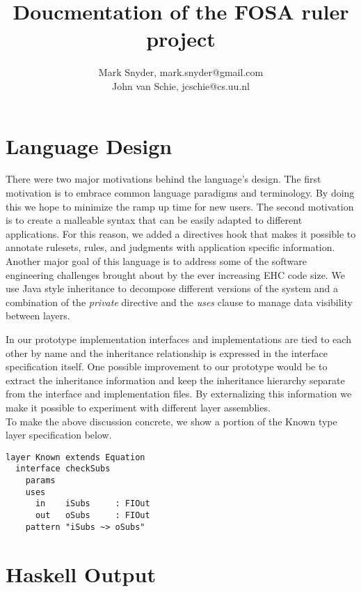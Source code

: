 \documentclass[10pt]{article}
\begin{document}
\title{Doucmentation of the FOSA ruler project}
\author{Mark Snyder, mark.snyder@gmail.com\\John van Schie, jcschie@cs.uu.nl}
\date{}
\maketitle
\parindent=0in

\section{Language Design}
There were two major motivations behind the language's design.  The first motivation is to
embrace common language paradigms and terminology.  By doing this we hope to minimize
the ramp up time for new users.  The second motivation is to create a malleable syntax that 
can be easily adapted to different applications.  For this reason, we added a directives hook
that makes it possible to annotate rulesets, rules, and judgments with application specific
information.  \\

Another major goal of this language is to address some of the software engineering challenges
brought about by the ever increasing EHC code size.  We use Java style inheritance to decompose
different versions of the system and a combination of the \emph{private} directive and the \emph{uses}
clause to manage data visibility between layers.

In our prototype implementation interfaces and implementations are tied to each other by name
and the inheritance relationship is expressed in the interface specification itself.  One possible
improvement to our prototype would be to extract the inheritance information and keep the 
inheritance hierarchy separate from the interface and implementation files.  By externalizing this
information we make it possible to experiment with different layer assemblies.\\

To make the above discussion concrete, we show a portion of the Known type layer specification below.

\begin{verbatim}
layer Known extends Equation
  interface checkSubs
    params
    uses
      in    iSubs     : FIOut
      out   oSubs     : FIOut
    pattern "iSubs ~> oSubs"
\end{verbatim}

\section{Haskell Output}
\end{document}
